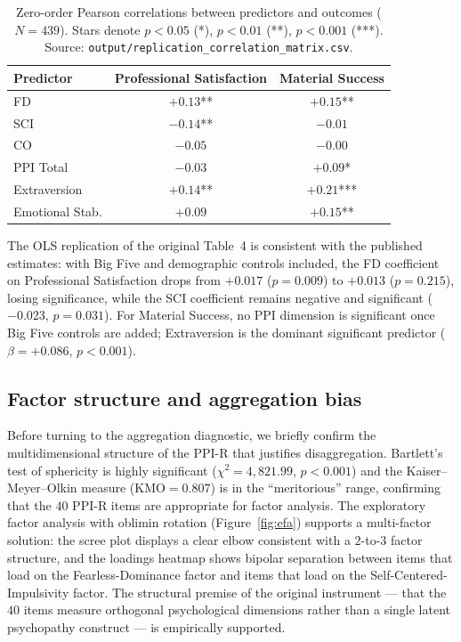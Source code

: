 \documentclass[11pt,a4paper]{article}
\begin{document}
\begin{table}[h!]
\centering
\caption{Zero-order Pearson correlations between predictors and
outcomes ($N=439$). Stars denote $p<0.05$ (*), $p<0.01$ (**),
$p<0.001$ (***). Source:
\texttt{output/replication\_correlation\_matrix.csv}.}
\label{tab:correlations}
\begin{tabular}{lcc}
\toprule
\textbf{Predictor} & \textbf{Professional Satisfaction} & \textbf{Material Success} \\
\midrule
FD              & $+0.13$**  & $+0.15$** \\
SCI             & $-0.14$**  & $-0.01$\phantom{**} \\
CO              & $-0.05$\phantom{**}  & $-0.00$\phantom{**} \\
PPI Total       & $-0.03$\phantom{**}  & $+0.09$* \\
\midrule
Extraversion    & $+0.14$**  & $+0.21$*** \\
Emotional Stab. & $+0.09$\phantom{**}  & $+0.15$** \\
\bottomrule
\end{tabular}
\end{table}

The OLS replication of the original Table~4 is consistent with the
published estimates: with Big Five and demographic controls included,
the FD coefficient on Professional Satisfaction drops from $+0.017$
($p=0.009$) to $+0.013$ ($p=0.215$), losing significance, while the
SCI coefficient remains negative and significant ($-0.023$,
$p=0.031$). For Material Success, no PPI dimension is significant
once Big Five controls are added; Extraversion is the dominant
significant predictor ($\beta=+0.086$, $p<0.001$).

\subsection{Factor structure and aggregation bias}
\label{sec:results-aggregation}

Before turning to the aggregation diagnostic, we briefly confirm the
multidimensional structure of the PPI-R that justifies disaggregation.
Bartlett's test of sphericity is highly significant
($\chi^2 = 4{,}821.99$, $p < 0.001$) and the Kaiser--Meyer--Olkin
measure ($\text{KMO} = 0.807$) is in the ``meritorious'' range,
confirming that the $40$ PPI-R items are appropriate for factor
analysis. The exploratory factor analysis with oblimin rotation
(Figure~\ref{fig:efa}) supports a multi-factor solution: the scree
plot displays a clear elbow consistent with a $2$-to-$3$ factor
structure, and the loadings heatmap shows bipolar separation between
items that load on the Fearless-Dominance factor and items that load
on the Self-Centered-Impulsivity factor. The structural premise of
the original instrument --- that the $40$ items measure orthogonal
psychological dimensions rather than a single latent psychopathy
construct --- is empirically supported.
\end{document}
